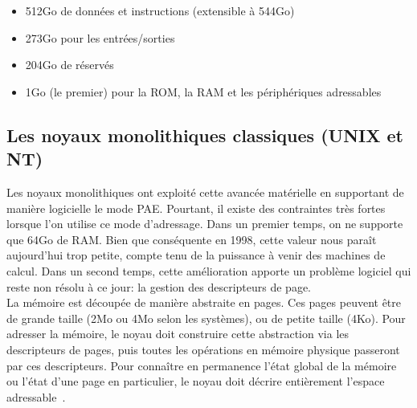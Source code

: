       \begin{itemize}
        \item 512Go de données et instructions (extensible à 544Go)
        \item 273Go pour les entrées/sorties
        \item 204Go de réservés
        \item 1Go (le premier) pour la ROM,
          la RAM et les périphériques adressables
      \end{itemize}


    \subsection{Les noyaux monolithiques classiques (UNIX et NT)}

      Les noyaux monolithiques ont exploité cette avancée matérielle en
      supportant de manière logicielle le mode PAE. Pourtant, il existe des
      contraintes très fortes lorsque l'on utilise ce mode d'adressage. Dans un
      premier temps, on ne supporte que 64Go de RAM. Bien que conséquente en
      1998, cette valeur nous paraît aujourd'hui trop petite, compte tenu de la
      puissance à venir des machines de calcul.  Dans un second temps, cette
      amélioration apporte un problème logiciel qui reste non résolu à ce jour:
      la gestion des descripteurs de page.\\

      La mémoire est découpée de manière abstraite en pages. Ces pages peuvent
      être de grande taille (2Mo ou 4Mo selon les systèmes), ou de petite taille
      (4Ko). Pour adresser la mémoire, le noyau doit construire cette
      abstraction via les descripteurs de pages, puis toutes les opérations en
      mémoire physique passeront par ces descripteurs. Pour connaître en
      permanence l'état global de la mémoire ou l'état d'une page en
      particulier, le noyau doit décrire entièrement l'espace
      adressable~\citep{cranor1999uvm, gorman2004understanding,
        russinovich2012windows, dillon2000design, steldt2009memory,
        steldtXXXXopenbsd}.

